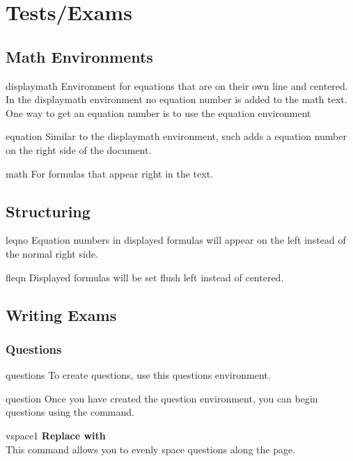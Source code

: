 \documentclass[12pt,hidelinks]{article}
\begin{document}
\section{Tests/Exams}	
\vspace{10.5cm}	
	\subsection{Math Environments}\label{subsec:mathenvironments}
		\begin{docEnvironment}{displaymath}{}
			Environment for equations that are on their own line and centered. In the displaymath environment no equation number is added to the math text. One way to get an equation number is to use the equation environment
		\end{docEnvironment}
		\begin{docEnvironment}{equation}{}
			Similar to the displaymath environment, such adds a equation number on the right side of the document.
		\end{docEnvironment}	
		\begin{docEnvironment}{math}{}
			For formulas that appear right in the text. 
		\end{docEnvironment}
	\subsection{Structuring}
		\begin{docCommand}{leqno}{}
			Equation numbers in displayed formulas will appear on the left instead of the normal right side.
		\end{docCommand}
		\begin{docCommand}{fleqn}{}
			Displayed formulas will be set flush left instead of centered.
		\end{docCommand}
	\subsection{Writing Exams}\label{subsec:writingexams}
		\subsubsection{Questions}
			\begin{docEnvironment}{questions}{}\label{questionenv}
				To create questions, use this questions environment. 
			\end{docEnvironment}
			\begin{docCommand}{question}{}
				Once you have created the question environment, you can begin questions using the  command.
			\end{docCommand}
			\begin{docCommand}{vspace1}{}
			    \textbf{Replace  with }\\
				This command allows you to evenly space questions along the page.
			\end{docCommand}
\end{document}
